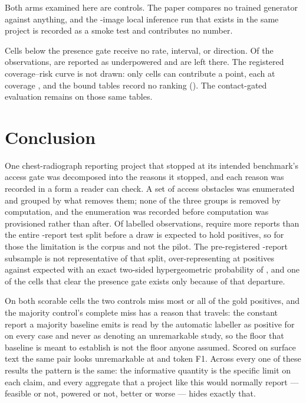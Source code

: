 Both arms examined here are controls. The paper compares no trained generator
against anything, and the \HarnessImages{}-image local inference run that
exists in the same project is recorded as a smoke test and contributes no
number.

Cells below the presence gate receive no rate, interval, or direction. Of the
\NFindings{} observations, \NUnderpowered{} are reported as underpowered and
are left there. The registered coverage--risk curve is not drawn: only
\NCoverageRiskPoints{} cells can contribute a point, each at coverage
\CoverageRiskCoverage{}, and the bound tables record no ranking
(\CoverageRiskRanking{}). The contact-gated evaluation remains
\TypeRBound{} on those same tables.

\section{Conclusion}

One chest-radiograph reporting project that stopped at its intended
benchmark's access gate was decomposed into the reasons it stopped, and each
reason was recorded in a form a reader can check. A set of \NLocks{} access
obstacles was enumerated and grouped by what removes them; none of the three
groups is removed by computation, and the enumeration was recorded before
computation was provisioned rather than after. Of \NFindings{} labelled
observations, \NExceedSplit{} require more reports than the entire
\NTest{}-report test split before a draw is expected to hold \MinPresent{}
positives, so for those the limitation is the corpus and not the pilot. The
pre-registered \NCohort{}-report subsample is not representative of that
split, over-representing \SkewFinding{} at \SkewObserved{} positives against
\SkewExpected{} expected with an exact two-sided hypergeometric probability of
\SkewP{}, and one of the \NScored{} cells that clear the presence gate exists
only because of that departure.

On both scorable cells the two controls miss most or all of the gold
positives, and the majority control's complete miss has a reason that travels:
the constant report a majority baseline emits is read by the automatic
labeller as positive for \MajAsserted{} on every case and never as denoting an
unremarkable study, so the floor that baseline is meant to establish is not
the floor anyone assumed. Scored on surface text the same pair looks
unremarkable at \SurfaceRetrievalF{} and \SurfaceMajorityF{} token F1. Across
every one of these results the pattern is the same: the informative quantity
is the specific limit on each claim, and every aggregate that a project like
this would normally report --- feasible or not, powered or not, better or
worse --- hides exactly that.

